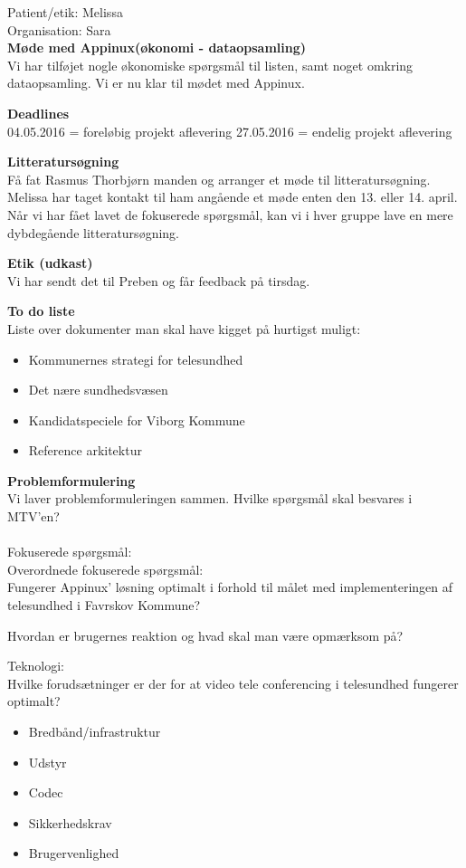 Patient/etik:
Melissa\\

Organisation:
Sara\\


\textbf{Møde med Appinux(økonomi - dataopsamling)}
\\
Vi har tilføjet nogle økonomiske spørgsmål til listen, samt noget omkring dataopsamling. Vi er nu klar til mødet med Appinux. 

\textbf{Deadlines}
\\
04.05.2016 = foreløbig projekt aflevering
27.05.2016 = endelig projekt aflevering

\textbf{Litteratursøgning}
\\
Få fat Rasmus Thorbjørn manden og arranger et møde til litteratursøgning.
Melissa har taget kontakt til ham angående et møde enten den 13. eller 14. april.\\
Når vi har fået lavet de fokuserede spørgsmål, kan vi i hver gruppe lave en mere dybdegående litteratursøgning. 

\textbf{Etik (udkast)}
\\
Vi har sendt det til Preben og får feedback på tirsdag. 

\textbf{To do liste}
\\
Liste over dokumenter man skal have kigget på hurtigst muligt:
\begin{itemize}
	\item Kommunernes strategi for telesundhed
	\item Det nære sundhedsvæsen
	\item Kandidatspeciele for Viborg Kommune
	\item Reference arkitektur
\end{itemize}

\textbf{Problemformulering}
\\
Vi laver problemformuleringen sammen. Hvilke spørgsmål skal besvares i MTV'en?\\ \\

Fokuserede spørgsmål: \\

Overordnede fokuserede spørgsmål: \\
Fungerer Appinux' løsning optimalt i forhold til målet med implementeringen af telesundhed i Favrskov Kommune?

Hvordan er brugernes reaktion og hvad skal man være opmærksom på?

Teknologi: \\
Hvilke forudsætninger er der for at video tele conferencing i telesundhed fungerer optimalt?\\
\begin{itemize}
	\item Bredbånd/infrastruktur
	\item Udstyr
	\item Codec
	\item Sikkerhedskrav
	\item Brugervenlighed
\end{itemize}

